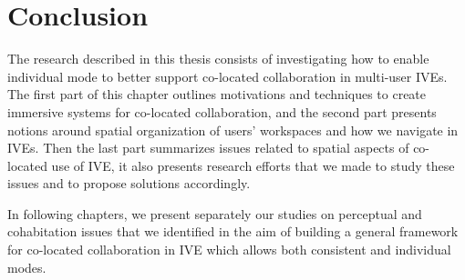 
\section{Conclusion}
The research described in this thesis consists of investigating how to enable individual mode to better support co-located collaboration in multi-user IVEs. The first part of this chapter outlines motivations and techniques to create immersive systems for co-located collaboration, and the second part presents notions around spatial organization of users' workspaces and how we navigate in IVEs. Then the last part summarizes issues related to spatial aspects of co-located use of IVE, it also presents research efforts that we made to study these issues and to propose solutions accordingly.

In following chapters, we present separately our studies on perceptual and cohabitation issues that we identified in the aim of building a general framework for co-located collaboration in IVE which allows both consistent and individual modes.